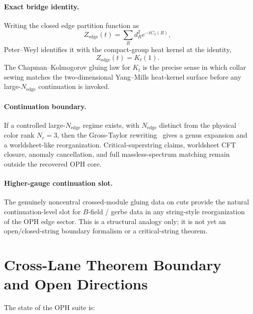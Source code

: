 \paragraph{Exact bridge identity.}
Writing the closed edge partition function as
\[
Z_{\mathrm{edge}}(t)=\sum_R d_R^2 e^{-tC_2(R)},
\]
Peter--Weyl identifies it with the compact-group heat kernel at the identity,
\[
Z_{\mathrm{edge}}(t)=K_t(1).
\]
The Chapman--Kolmogorov gluing law for \(K_t\) is the precise sense in which collar sewing
matches the two-dimensional Yang--Mills heat-kernel surface before any large-\(N_{\mathrm{edge}}\)
continuation is invoked.

\paragraph{Continuation boundary.}
If a controlled large-\(N_{\mathrm{edge}}\) regime exists, with \(N_{\mathrm{edge}}\) distinct from
the physical color rank \(N_c=3\), then the Gross-Taylor rewriting~\cite{grossTaylor93} gives a genus expansion and a
worldsheet-like reorganization. Critical-superstring claims, worldsheet CFT closure, anomaly
cancellation, and full massless-spectrum matching remain outside the recovered OPH core.

\paragraph{Higher-gauge continuation slot.}
The genuinely noncentral crossed-module gluing data on cuts provide the natural continuation-level
slot for \(B\)-field / gerbe data in any string-style reorganization of the OPH edge sector. This
is a structural analogy only; it is not yet an open/closed-string boundary formalism or a
critical-string theorem.

\section{Cross-Lane Theorem Boundary and Open Directions}

The state of the OPH suite is:

